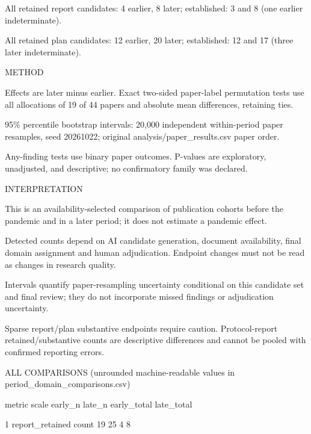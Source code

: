 \documentclass[10pt,a4paper]{article}
\begin{document}
All retained report candidates: 4 earlier, 8 later; established: 3 and 8 (one earlier indeterminate).\allowbreak{}\par
All retained plan candidates: 12 earlier, 20 later; established: 12 and 17 (three later indeterminate).\allowbreak{}\par
METHOD\par
Effects are later minus earlier.\allowbreak{} Exact two-\allowbreak{}sided paper-\allowbreak{}label permutation tests use all allocations of 19 of 44 papers and absolute mean differences, retaining ties.\allowbreak{}\par
95\% percentile bootstrap intervals: 20,000 independent within-\allowbreak{}period paper resamples, seed 20261022; original analysis/\allowbreak{}paper\_\allowbreak{}results.\allowbreak{}csv paper order.\allowbreak{}\par
Any-\allowbreak{}finding tests use binary paper outcomes.\allowbreak{} P-\allowbreak{}values are exploratory, unadjusted, and descriptive; no confirmatory family was declared.\allowbreak{}\par
INTERPRETATION\par
This is an availability-\allowbreak{}selected comparison of publication cohorts before the pandemic and in a later period; it does not estimate a pandemic effect.\allowbreak{}\par
Detected counts depend on AI candidate generation, document availability, final domain assignment and human adjudication.\allowbreak{} Endpoint changes must not be read as changes in research quality.\allowbreak{}\par
Intervals quantify paper-\allowbreak{}resampling uncertainty conditional on this candidate set and final review; they do not incorporate missed findings or adjudication uncertainty.\allowbreak{}\par
Sparse report/\allowbreak{}plan substantive endpoints require caution.\allowbreak{} Protocol-\allowbreak{}report retained/\allowbreak{}substantive counts are descriptive differences and cannot be pooled with confirmed reporting errors.\allowbreak{}\par
ALL COMPARISONS (unrounded machine-\allowbreak{}readable values in period\_\allowbreak{}domain\_\allowbreak{}comparisons.\allowbreak{}csv)\par
                            metric scale early\_\allowbreak{}n late\_\allowbreak{}n early\_\allowbreak{}total late\_\allowbreak{}total\par
1                  report\_\allowbreak{}retained count      19     25           4          8\par
\end{document}
